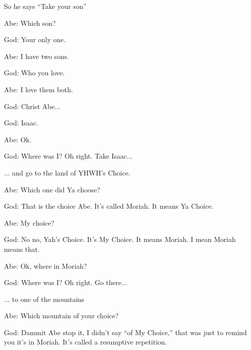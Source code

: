 {
	So he says ``Take your son''

	\begin{midrash}

	Abe: Which son?

	\end{midrash}

	God: Your only one.

	\begin{midrash}

	Abe: I have two sons.

	\end{midrash}

	God: Who you love.

	\begin{midrash}

	Abe: I love them both.

	God: Christ Abe...

	\end{midrash}

	God: Isaac.

	\begin{midrash}

	Abe: Ok.

	God: Where was I? Oh right. Take Isaac...

	\end{midrash}

	... and go to the land of YHWH's Choice.

	\begin{midrash}

	Abe: Which one did Ya choose?

	God: That is the choice Abe. It's called Moriah. It means Ya Choice.

	Abe: My choice?

	God: No no, Yah's Choice. It's My Choice. It means Moriah. I mean Moriah means that.

	Abe: Ok, where in Moriah?

	God: Where was I? Oh right. Go there...

	\end{midrash}

	... to one of the mountains 

	\begin{midrash}

	Abe: Which mountain of your choice?

	God: Dammit Abe stop it, I didn't say ``of My Choice,'' that was just to remind you it's in Moriah. It's called a resumptive repetition.


\end{midrash}}
